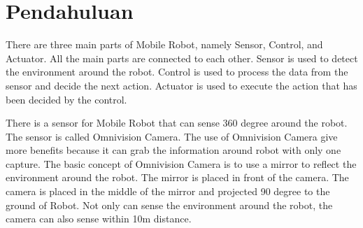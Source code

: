 \section{Pendahuluan}
\label{sec:pendahuluan}


There are three main parts of Mobile Robot, namely Sensor, Control, and Actuator. All the main parts are connected to each other. Sensor is used to detect the environment around the robot. Control is used to process the data from the sensor and decide the next action. Actuator is used to execute the action that has been decided by the control.  
 
There is a sensor for Mobile Robot that can sense 360 degree around the robot. The sensor is called Omnivision Camera. The use of Omnivision Camera give more benefits because it can grab the information around robot with only one capture. The basic concept of Omnivision Camera is to use a mirror to reflect the environment around the robot. The mirror is placed in front of the camera. The camera is placed in the middle of the mirror and projected 90 degree to the ground of Robot. Not only can sense the environment around the robot, the camera can also sense within 10m distance.